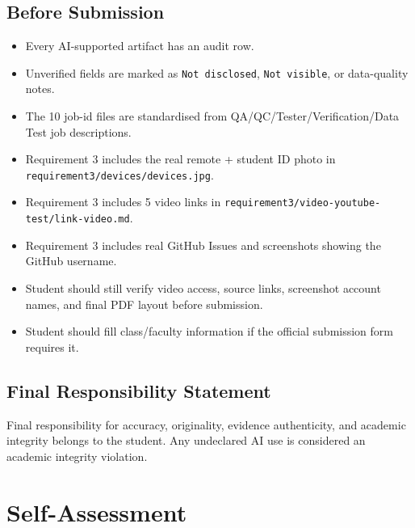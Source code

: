 \documentclass[12pt, a4paper]{article}
\begin{document}
\subsection{Before Submission}

\begin{itemize}[leftmargin=*, itemsep=4pt]
  \item[$\checkmark$] Every AI-supported artifact has an audit row.
  \item[$\checkmark$] Unverified fields are marked as \texttt{Not disclosed}, \texttt{Not visible}, or data-quality notes.
  \item[$\checkmark$] The 10 job-id files are standardised from QA/QC/Tester/Verification/Data Test job descriptions.
  \item[$\checkmark$] Requirement 3 includes the real remote + student ID photo in \texttt{requirement3/devices/devices.jpg}.
  \item[$\checkmark$] Requirement 3 includes 5 video links in \texttt{requirement3/video-youtube-test/link-video.md}.
  \item[$\checkmark$] Requirement 3 includes real GitHub Issues and screenshots showing the GitHub username.
  \item[$\square$] Student should still verify video access, source links, screenshot account names, and final PDF layout before submission.
  \item[$\square$] Student should fill class/faculty information if the official submission form requires it.
\end{itemize}

\subsection{Final Responsibility Statement}

Final responsibility for accuracy, originality, evidence authenticity, and academic integrity belongs to the student. Any undeclared AI use is considered an academic integrity violation.

\section{Self-Assessment}
\end{document}
